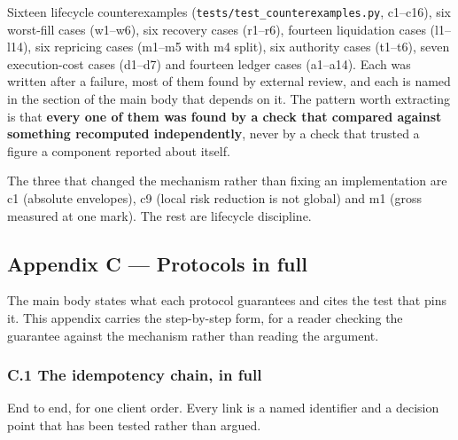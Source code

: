 \documentclass[10pt,a4paper]{article}
\begin{document}
Sixteen lifecycle counterexamples (\texttt{tests/test\_counterexamples.py}, c1--c16), six
worst-fill cases (w1--w6), six recovery cases (r1--r6), fourteen liquidation cases
(l1--l14), six repricing cases (m1--m5 with m4 split), six authority cases
(t1--t6), seven execution-cost cases (d1--d7) and fourteen ledger cases (a1--a14).
Each was written after a failure, most of them found by external review, and
each is named in the section of the main body that depends on it. The pattern
worth extracting is that \textbf{every one of them was found by a check that compared
against something recomputed independently}, never by a check that trusted a
figure a component reported about itself.

The three that changed the mechanism rather than fixing an implementation are
c1 (absolute envelopes), c9 (local risk reduction is not global) and m1 (gross
measured at one mark). The rest are lifecycle discipline.



\label{start:12}%

\subsection{Appendix C --- Protocols in full}\label{appendix-c-protocols-in-full}

The main body states what each protocol guarantees and cites the test that pins
it. This appendix carries the step-by-step form, for a reader checking the
guarantee against the mechanism rather than reading the argument.

\subsubsection{C.1 The idempotency chain, in full}\label{c.1-the-idempotency-chain-in-full}

End to end, for one client order. Every link is a named identifier and a
decision point that has been tested rather than argued.
\end{document}
